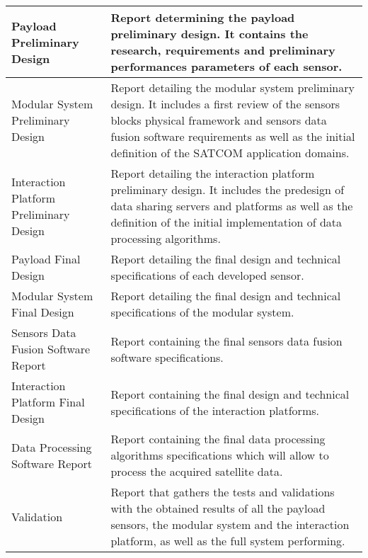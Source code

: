 \begin{longtable}[H]{>{\raggedright\arraybackslash}p{4cm} p{10cm}}
	Payload Preliminary Design  & 
	Report determining the payload preliminary design. It contains the research, requirements and preliminary performances parameters of each sensor.
	 \vspace{0.2cm}
	\\ \midrule

	Modular System Preliminary Design  & 
	Report detailing the modular system preliminary design. It includes a first review of the sensors blocks physical framework and sensors data fusion software requirements as well as the initial definition of the SATCOM application domains. 
	\vspace{0.2cm}
	\\ \midrule

	Interaction Platform Preliminary Design  & 
	Report detailing the interaction platform preliminary design. It includes the predesign of data sharing servers and platforms as well as the definition of the initial implementation of data processing algorithms.  
	\vspace{0.2cm}
	\\ \midrule
	
	Payload Final Design  & 
	Report detailing the final design and technical specifications of each developed sensor. 
	\vspace{0.2cm}
	\\ \midrule

	Modular System  Final Design  & 
	Report detailing the final design and technical specifications of the modular system. 
	\vspace{0.2cm}
	\\ \midrule

	Sensors Data Fusion Software Report  & 
	Report containing the final sensors data fusion software specifications.
	\vspace{0.2cm}
	\\ \midrule

	Interaction Platform Final Design  & 
	Report containing the final design and technical specifications of the interaction platforms. 
	\vspace{0.2cm}
	\\ \midrule

	Data Processing Software Report  & 
	Report containing the final data processing algorithms specifications which will allow to process the acquired satellite data. 
	\vspace{0.2cm}
	\\ \midrule

	Validation & 
	Report that gathers the tests and validations with the obtained results of all the payload sensors, the modular system and the interaction platform, as well as the full system performing. 
	\vspace{0.2cm}
	\\ \midrule
		

\end{longtable}
